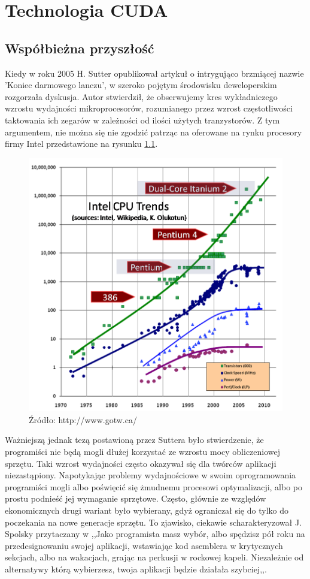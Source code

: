 \chapter{Technologia CUDA}
\section{Współbieżna przyszłość}
Kiedy w roku 2005 H. Sutter \cite{lunch} opublikował artykuł o intrygująco 
brzmiącej nazwie 'Koniec darmowego lanczu', w szeroko pojętym środowisku 
deweloperskim rozgorzała dyskusja. Autor stwierdził, że obserwujemy kres 
wykładniczego wzrostu wydajności mikroprocesorów, rozumianego przez wzrost 
częstotliwości taktowania ich zegarów w zależności od ilości użytych
tranzystorów. Z tym argumentem, nie można się nie zgodzić patrząc na
oferowane na rynku procesory firmy Intel przedstawione na rysunku \ref{proce}.

\begin{figure}[ht]
\centering
\includegraphics[scale=1.0]{images/CPU.png}
\caption{Źródło: http://www.gotw.ca/}
\label{proce}
\end{figure}

Ważniejszą jednak tezą postawioną przez Suttera było stwierdzenie, że
programiści nie będą mogli dłużej korzystać ze wzrostu mocy obliczeniowej
sprzętu. Taki wzrost wydajności często okazywał się dla twórców aplikacji
niezastąpiony. Napotykając problemy wydajnościowe w swoim oprogramowania
programiści mogli albo poświęcić się żmudnemu procesowi optymalizacji, albo
po prostu podnieść jej wymaganie sprzętowe. Często, głównie ze względów
ekonomicznych drugi wariant było wybierany, gdyż ograniczał się do tylko do
poczekania na nowe generacje sprzętu. To zjawisko, ciekawie scharakteryzował J.
Spolsky przytaczany w \cite{nolunch} ,,Jako programista masz wybór, albo
spędzisz pół roku na przedesignowaniu swojej aplikacji, wstawiając kod asemblera
w krytycznych sekcjach, albo na wakacjach, grając na perkusji w rockowej kapeli.
Niezależnie od alternatywy którą wybierzesz, twoja aplikacji będzie działała
szybciej,,.

